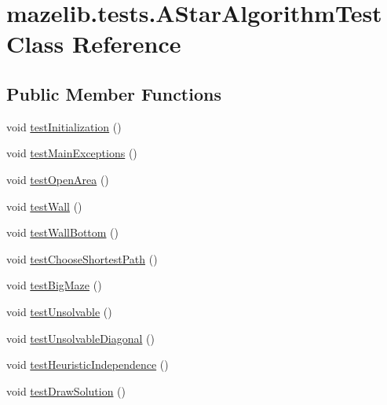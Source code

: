 \hypertarget{classmazelib_1_1tests_1_1_a_star_algorithm_test}{\section{mazelib.\-tests.\-A\-Star\-Algorithm\-Test Class Reference}
\label{classmazelib_1_1tests_1_1_a_star_algorithm_test}
}
\subsection*{Public Member Functions}
\begin{DoxyCompactItemize}
\item 
void \hyperlink{classmazelib_1_1tests_1_1_a_star_algorithm_test_aec72fa33496b078a0ee88787b17a7cc5}{test\-Initialization} ()
\item 
void \hyperlink{classmazelib_1_1tests_1_1_a_star_algorithm_test_ad9fcdd615a22dabd3bb98b1b81dc530e}{test\-Main\-Exceptions} ()
\item 
void \hyperlink{classmazelib_1_1tests_1_1_a_star_algorithm_test_afa88278c8a99dc756060007a71298d2f}{test\-Open\-Area} ()
\item 
void \hyperlink{classmazelib_1_1tests_1_1_a_star_algorithm_test_a07d1b247735c9e93be964c1586f55429}{test\-Wall} ()
\item 
void \hyperlink{classmazelib_1_1tests_1_1_a_star_algorithm_test_a70d4c1c704f663de17dd29062f923277}{test\-Wall\-Bottom} ()
\item 
void \hyperlink{classmazelib_1_1tests_1_1_a_star_algorithm_test_a04e1e2fc7c9f096b47e0020ecefce31f}{test\-Choose\-Shortest\-Path} ()
\item 
void \hyperlink{classmazelib_1_1tests_1_1_a_star_algorithm_test_af211b27410c2c9b99f7d4ada33cf73d1}{test\-Big\-Maze} ()
\item 
void \hyperlink{classmazelib_1_1tests_1_1_a_star_algorithm_test_a1fe74aadca4426101c6b37bad8c3bcc1}{test\-Unsolvable} ()
\item 
void \hyperlink{classmazelib_1_1tests_1_1_a_star_algorithm_test_a1dff79da0548389e66dafcbe2cd5cbbe}{test\-Unsolvable\-Diagonal} ()
\item 
void \hyperlink{classmazelib_1_1tests_1_1_a_star_algorithm_test_a947f5b9044e94187fe46787c388df05b}{test\-Heuristic\-Independence} ()
\item 
void \hyperlink{classmazelib_1_1tests_1_1_a_star_algorithm_test_a0ef8a993413de21e3ded9372183d637d}{test\-Draw\-Solution} ()
\end{DoxyCompactItemize}


